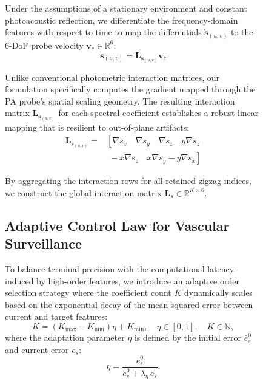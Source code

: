 \documentclass{article}
\begin{document}
\begin{figure}[htbp]
Under the assumptions of a stationary environment and constant photoacoustic reflection, we differentiate the frequency-domain features with respect to time to map the differentials \(\dot{\boldsymbol{s}}_{(u,v)}\) to the 6-DoF probe velocity \(\mathbf{v}_c \in \mathbb{R}^6\):
\begin{equation}
\dot{\boldsymbol{s}}_{(u,v)} = \boldsymbol{L}_{\boldsymbol{s}_{(u,v)}} \mathbf{v}_c
\end{equation}

Unlike conventional photometric interaction matrices, our formulation specifically computes the gradient mapped through the PA probe's spatial scaling geometry. The resulting interaction matrix \(\boldsymbol{L}_{\boldsymbol{s}_{(u,v)}}\) for each spectral coefficient establishes a robust linear mapping that is resilient to out-of-plane artifacts:
\begin{equation} \label{eq:L_s_uv}
	\begin{aligned}
		\boldsymbol{L}_{s_{(u,v)}} = 
		& \left[\nabla s_x \quad \nabla s_y \quad \nabla s_z \quad y\nabla s_z \right. \\
		&\left.\; -x\nabla s_z \quad x\nabla s_y - y\nabla s_x\right]
	\end{aligned}
\end{equation}

By aggregating the interaction rows for all retained zigzag indices, we construct the global interaction matrix \(\boldsymbol{L}_s \in \mathbb{R}^{K \times 6}\).

\subsection{Adaptive Control Law for Vascular Surveillance}
\label{sec:Adaptive_Control_Law}

To balance terminal precision with the computational latency induced by high-order features, we introduce an adaptive order selection strategy where the coefficient count \(K\) dynamically scales based on the exponential decay of the mean squared error between current and target features:
\begin{equation}
K = \left(K_{\max} - K_{\min}\right) \eta + K_{\min}, \quad \eta \in [0, 1], \quad K \in \mathbb{N},
\end{equation}
where the adaptation parameter \(\eta\) is defined by the initial error \(\bar{e}_s^0\) and current error \(\bar{e}_s\):
\begin{equation}
\eta = \frac{\bar{e}_s^0}{\bar{e}_s^0 + \lambda_\eta \, \bar{e}_s}.
\end{equation}


\end{figure}
\end{document}
